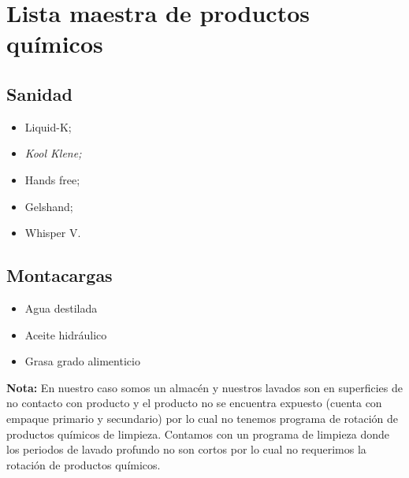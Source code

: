 \thispagestyle{formato-PI}
\renewcommand{\MenorVer}{0}
\renewcommand{\MayorVer}{2}
\renewcommand{\Codigo}{HYS-25-L}
\renewcommand{\FechaPub}{2023--01}
\renewcommand{\Titulo}{Lista maestra de productos químicos}

\section{\Titulo}

\subsection{Sanidad}
\begin{itemize}
	\item Liquid-K;
	\item \textit{Kool Klene;}
	\item Hands free;
	\item Gelshand;
	\item Whisper V.
\end{itemize}

\subsection{Montacargas}
\begin{itemize}
	\item Agua destilada
	\item Aceite hidráulico
	\item Grasa grado alimenticio
\end{itemize}

\textbf{Nota:} En nuestro caso somos un almacén y nuestros lavados son en superficies de no contacto con producto y el producto no se encuentra expuesto (cuenta con empaque primario y secundario) por lo cual no tenemos programa de rotación de productos químicos de limpieza. Contamos con un programa de limpieza donde los periodos de lavado profundo no son cortos por lo cual no requerimos la rotación de productos químicos.
